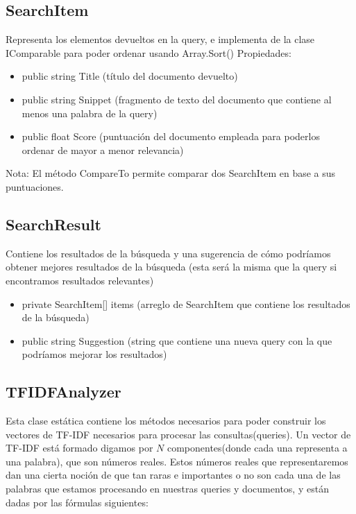 \documentclass[a4paper,12pt]{article}
\begin{document}
\subsection{SearchItem}\label{sub:search-item}
Representa los elementos devueltos en la query, e implementa de la clase IComparable
para poder ordenar usando Array.Sort()
Propiedades:
\begin{itemize}
    \item public string Title (título del documento devuelto)
    \item public string Snippet (fragmento de texto del documento que contiene al menos una palabra de la
    query)
    \item public float Score (puntuación del documento empleada para poderlos ordenar de mayor a menor
    relevancia)
\end{itemize}

Nota: El método CompareTo permite comparar dos SearchItem en base a sus puntuaciones.

\subsection{SearchResult}\label{sub:search-result}
Contiene los resultados de la búsqueda y una sugerencia de cómo podríamos obtener
mejores resultados de la búsqueda (esta será la misma que la query si encontramos resultados
relevantes)
\begin{itemize}
    \item private SearchItem[] items (arreglo de SearchItem que contiene los resultados de la búsqueda)
    \item public string Suggestion (string que contiene una nueva query con la que podríamos mejorar los
    resultados)
\end{itemize}

\subsection{TFIDFAnalyzer}\label{sub:tfidf}
Esta clase estática contiene los métodos necesarios para poder construir los vectores de
TF-IDF necesarios para procesar las consultas(queries).
Un vector de TF-IDF está formado digamos por $N$ componentes(donde cada una
representa a una palabra), que son números reales. Estos números reales que representaremos
dan una cierta noción de que tan raras e importantes o no son cada una de las palabras que
estamos procesando en nuestras queries y documentos, y están dadas por las fórmulas siguientes:
\end{document}
